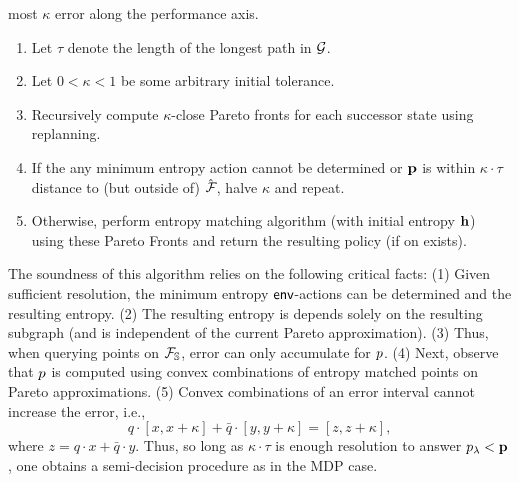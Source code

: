 most $\kappa$ error along the performance axis.
\begin{mdframed}
\begin{enumerate}
\item Let $\tau$ denote the length of the longest path in $\mathcal{G}$.
\item Let $0 < \kappa < 1$ be some arbitrary initial tolerance.
\item Recursively compute $\kappa$-close Pareto fronts for each successor state using replanning.
\item If the any minimum entropy action cannot be determined or $\mathbf{p}$ is within $\kappa\cdot \tau$ distance to (but outside of) $\hat{\mathcal{F}_{}}$,
  halve $\kappa$ and repeat.
\item Otherwise, perform entropy matching algorithm (with initial
  entropy $\mathbf{h}$) using these Pareto Fronts and return the
  resulting policy (if on exists).
\end{enumerate}  
\end{mdframed}
The soundness of this algorithm relies on the following critical
facts: (1) Given sufficient resolution, the minimum entropy
$\mathsf{env}$-actions can be determined and the resulting entropy. (2) The
resulting entropy is depends solely on
the resulting subgraph (and is independent of the current Pareto
approximation). (3) Thus, when querying points on
$\mathcal{F}_{\mathbb{S}}$, error can only accumulate for $p$. (4) Next,
observe that $p$ is computed using convex combinations of entropy
matched points on Pareto approximations. (5) Convex combinations of an error interval cannot
increase the error, i.e.,
\begin{equation}
  q\cdot[x, x + \kappa] + \bar{q}\cdot[y, y + \kappa] = [z, z + \kappa],
\end{equation}
where $z = q\cdot x + \bar{q}\cdot y$.
Thus, so long as $\kappa\cdot\tau$ is enough resolution to answer $p_\lambda <
\mathbf{p}$, one obtains a semi-decision procedure as in the MDP
case.


